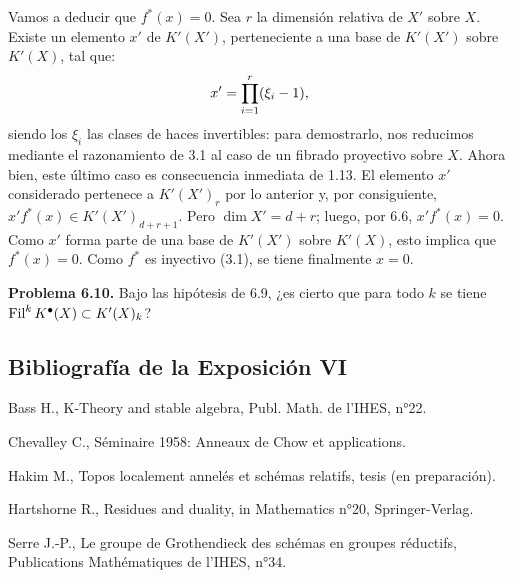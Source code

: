 Vamos a deducir que $f^*(x)=0$. Sea $r$ la dimensión relativa de $X'$ sobre $X$. Existe un elemento $x'$ de $K'(X')$, perteneciente a una base de $K'(X')$ sobre $K'(X)$, tal que:
\[
  x'=\prod_{i=\sisi{0}{1}}^{r}(\xi_i-1),
\]
siendo los $\xi_i$ las clases de haces invertibles: para demostrarlo, nos reducimos mediante el razonamiento de 3.1 al caso de un fibrado proyectivo sobre $X$. Ahora bien, este último caso es consecuencia inmediata de 1.13. El elemento $x'$ considerado pertenece a $K'(X')_r$ por lo anterior y, por consiguiente, $x'f^*(x)\in K'(X')_{d+r+1}$. Pero $\dim X'=d+r$; luego, por 6.6, $x'f^*(x)=0$. Como $x'$ forma parte de una base de $K'(X')$ sobre $K'(X)$, esto implica que $f^*(x)=0$. Como $f^*$ es inyectivo (3.1), se tiene finalmente $x=0$.

\textbf{Problema 6.10.} Bajo las hipótesis de 6.9, ¿es cierto que para todo $k$ se tiene $\Fil^kK^{\bullet}(X)\subset K'(X)_k$?

\subsection*{Bibliografía de la Exposición VI}
\begin{enumerate}[label={\textup{[\arabic*]}}]
\item Bass H., K-Theory and stable algebra, Publ. Math. de l'IHES, n°22.
\item Chevalley C., Séminaire 1958: Anneaux de Chow et applications.
\item Hakim M., Topos localement annelés et schémas relatifs, tesis (en preparación).
\item Hartshorne R., Residues and duality,  in Mathematics n°20, Springer-Verlag.
\item Serre J.-P., Le groupe de Grothendieck des schémas en groupes réductifs, Publications Mathématiques de l'IHES, n°34.
\end{enumerate}

